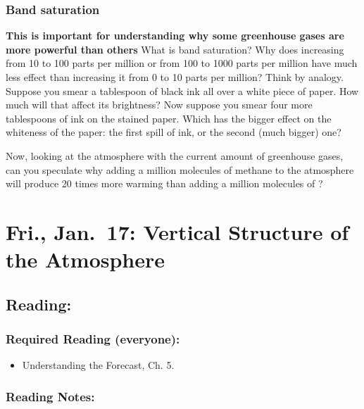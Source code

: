 \documentclass[
]{article}
\providecommand{\tightlist}{%
  \setlength{\itemsep}{0pt}\setlength{\parskip}{0pt}}
\newcommand{\COO}{\ce{CO2}}
\begin{document}
\hypertarget{band-saturation}{%
\subsubsection{Band saturation}\label{band-saturation}}

\textbf{This is important for understanding why some greenhouse gases
are more powerful than others} What is band saturation? Why does
increasing \COO from 10 to 100 parts per million or from 100 to 1000
parts per million have much less effect than increasing it from 0 to 10
parts per million? Think by analogy. Suppose you smear a tablespoon of
black ink all over a white piece of paper. How much will that affect its
brightness? Now suppose you smear four more tablespoons of ink on the
stained paper. Which has the bigger effect on the whiteness of the
paper: the first spill of ink, or the second (much bigger) one?

Now, looking at the atmosphere with the current amount of greenhouse
gases, can you speculate why adding a million molecules of methane to
the atmosphere will produce 20 times more warming than adding a million
molecules of \COO?

\hypertarget{fri.-jan.-17-vertical-structure-of-the-atmosphere}{%
\section{Fri., Jan.~17: Vertical Structure of the
Atmosphere}\label{fri.-jan.-17-vertical-structure-of-the-atmosphere}}

\hypertarget{reading-5}{%
\subsection{Reading:}\label{reading-5}}

\hypertarget{required-reading-everyone-4}{%
\subsubsection{Required Reading
(everyone):}\label{required-reading-everyone-4}}

\begin{itemize}
\tightlist
\item
  Understanding the Forecast, Ch. 5.
\end{itemize}

\hypertarget{reading-notes-4}{%
\subsubsection{Reading Notes:}\label{reading-notes-4}}
\end{document}

